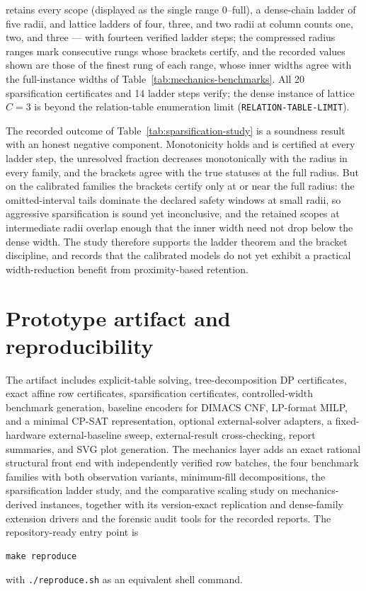 \documentclass[11pt]{article}
\theoremstyle{plain}
\theoremstyle{definition}
\theoremstyle{remark}
\begin{document}
\begin{center}
{retains every scope (displayed as the single range \(0\)--full), a dense-chain ladder of five radii, and lattice
ladders of four, three, and two radii at column counts one, two, and three
--- with fourteen
verified ladder steps; the compressed radius ranges mark consecutive rungs
whose brackets certify, and the recorded values shown are those of the
finest rung of each range, whose inner widths agree with the full-instance
widths of Table~\ref{tab:mechanics-benchmarks}.  All 20
sparsification certificates and 14 ladder steps verify; the dense instance
of lattice \(C{=}3\) is beyond the relation-table enumeration limit
(\texttt{RELATION-TABLE-LIMIT}).}
\label{tab:sparsification-study}
\end{center}

The recorded outcome of Table~\ref{tab:sparsification-study} is a soundness result with an honest negative
component.  Monotonicity holds and is certified at every ladder step, the
unresolved fraction decreases monotonically with the radius in every family,
and the brackets agree with the true statuses at the full radius.  But on
the calibrated families the brackets certify only at or near the full
radius: the omitted-interval tails dominate the declared safety windows at
small radii, so aggressive sparsification is sound yet inconclusive, and the
retained scopes at intermediate radii overlap enough that the inner width
need not drop below the dense width.  The study therefore supports the
ladder theorem and the bracket discipline, and records that the calibrated
models do not yet exhibit a practical width-reduction benefit from
proximity-based retention.

\section{Prototype artifact and reproducibility}
\label{sec:artifact}

The artifact includes explicit-table solving, tree-decomposition DP
certificates, exact affine row certificates, sparsification certificates,
controlled-width benchmark generation, baseline encoders for DIMACS CNF,
LP-format MILP, and a minimal CP-SAT representation, optional
external-solver adapters, a fixed-hardware external-baseline sweep,
external-result cross-checking, report summaries, and SVG plot generation.
The mechanics layer adds an exact rational structural front end with
independently verified row batches, the four benchmark families with both
observation variants, minimum-fill decompositions, the sparsification ladder
study, and the comparative scaling study on mechanics-derived instances,
together with its version-exact replication and dense-family extension
drivers and the forensic audit tools for the recorded reports.
The repository-ready entry point is
\begin{verbatim}
make reproduce
\end{verbatim}
with \texttt{./reproduce.sh} as an equivalent shell command.
\end{document}
